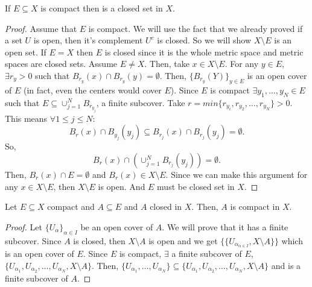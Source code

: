 \documentclass[a4paper]{article}
\begin{document}
\begin{prop}
  If $E \subseteq X$ is compact then is a closed set in $X$. 

  \begin{proof}
    Assume that $E$ is compact. We will use the fact that we already proved if a set $U$ is open, then it's complement
    $U^c$ is closed. So we will show $X \setminus E$ is an open set. If $E = X$ then  $E$ is closed since it is 
    the whole metric space and metric spaces are closed sets. Assume $E \neq X$. Then, take  $x \in X \setminus E$.
    For any $y \in E$,  $\exists r_y > 0$ such that $B_{r_y}(x) \cap B_{r_y}(y) = \emptyset$. Then,
    $\{B_{r_y} (Y)\}_{y \in E} $ is an open cover of $E$ (in fact, even the centers would cover $E$). Since
    $E$ is compact  $\exists y_1, \ldots, y_N \in E$ such that $E \subseteq \cup_{j=1}^N B_{r_{y_j}}$, a finite
    subcover.  Take $r = min \{r_{y_i}, r_{y_2}, \ldots, r_{y_N}\} > 0$. This means $\forall 1 \leq j \leq N$:
     \[
    B_r(x) \cap B_{y_j}(y_j) \subseteq B_{r_j} (x) \cap B_{r_j}(y_j) = \emptyset
    .\]
    So,
    \[
      B_r(x) \cap (\cup_{j=1}^N B_{r_j}(y_j)) = \emptyset
    .\] Then,
  $B_r(x) \cap E = \emptyset$ and  $B_r(x) \in X \setminus E$. Since we can make this argument for any
  $x \in X \setminus E$, then $X \setminus E$ is open. And $E$ must be closed set in $X$.
  \end{proof}
\end{prop}

\begin{prop}
  Let $E \subseteq X$ compact and  $A \subseteq E$ and $A$ closed in  $X$. Then, $A$ is compact in $X$. 
  \begin{proof}
  Let $\{ U_\alpha\}_{\alpha \in I}$ be an open cover of $A$. We will prove that it has a finite subcover. 
    Since $A$ is closed, then  $X \setminus A$ is open and we get $\{\{U_{\alpha}_{\alpha \in I} , X \setminus A \} \}$
    which is an open cover of $E$. Since  $E$ is compact,  $\exists $ a finite subcover of $E$, 
    $\{U_{\alpha_1}, U_{\alpha_2}, \ldots, U_{\alpha_N}, X\setminus A\}$. Then, $\{U_{\alpha_1}, \ldots, U_{\alpha_N} \}
     \subseteq \{U_{\alpha_1}, U_{\alpha_2}, \ldots, U_{\alpha_N}, X\setminus A\}$ and is a finite subcover of
    $A$.  
  \end{proof}
\end{prop}
\end{document}

